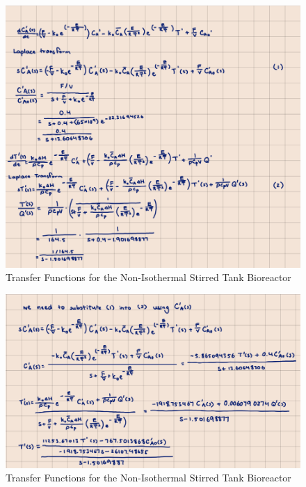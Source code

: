 \documentclass[12pt]{article}
\begin{document}
\begin{enumerate}
\begin{enumerate}
    \begin{figure}[H]
      \centering
      \includegraphics[width=\textwidth]{Figures/handcalc/figure4-4a.png}
      \caption{Transfer Functions for the Non-Isothermal Stirred Tank Bioreactor}
      \label{fig:figure45}
    \end{figure}

    \begin{figure}[H]
      \centering
      \includegraphics[width=\textwidth]{Figures/handcalc/figure4-4b.png}
      \caption{Transfer Functions for the Non-Isothermal Stirred Tank Bioreactor}
      \label{fig:figure46}
    \end{figure}


\end{enumerate}
\end{enumerate}
\end{document}
